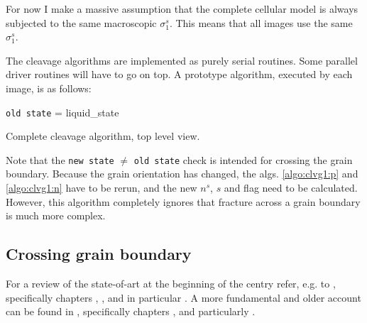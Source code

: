 For now I make a massive assumption that the complete
cellular model is always subjected to the same
macroscopic $\sigma_1^s$.
This means that all images use the same $\sigma_1^s$.

The cleavage algorithms are implemented as purely
serial routines.
Some parallel driver routines will have to go on top. 
A prototype algorithm, executed by each image, is as follows:

\begin{algorithm}[H]
\SetAlgoLined

\BlankLine
\texttt{old state} = liquid\_state\;
\caption{
Complete cleavage algorithm, top level view.
}
\label{algo:clvg:top}
\end{algorithm}

Note that the \texttt{new state} $\ne$
\texttt{old state} check
is intended for crossing the grain
boundary.
Because the grain orientation has changed,
the algs. \ref{algo:clvg1:p} and
\ref{algo:clvg1:n} have to be rerun,
and the new $n^s$, $s$ and flag need
to be calculated.
However, this algorithm completely ignores
that fracture across a grain boundary
is much more complex.

\subsection{Crossing grain boundary}

For a review of the state-of-art
at the beginning of the centry refer, e.g.
to \cite{gerberich2003v8}, specifically
chapters \cite{gerberich2003},
\cite{gerberich2003a}, \cite{milligan2003} and in particular
\cite{tan2003}.
A more fundamental and older account
can be found in \cite{liebowitz1968},
specifically chapters \cite{thomson1968},
\cite{bilby1968} and particularly \cite{beachem1968}.

